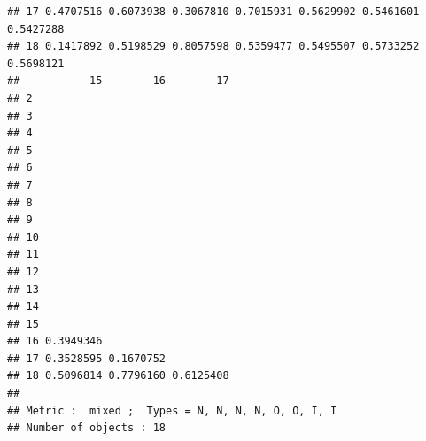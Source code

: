 \documentclass[
]{article}
\begin{document}
\begin{verbatim}
## 17 0.4707516 0.6073938 0.3067810 0.7015931 0.5629902 0.5461601 0.5427288
## 18 0.1417892 0.5198529 0.8057598 0.5359477 0.5495507 0.5733252 0.5698121
##           15        16        17
## 2                               
## 3                               
## 4                               
## 5                               
## 6                               
## 7                               
## 8                               
## 9                               
## 10                              
## 11                              
## 12                              
## 13                              
## 14                              
## 15                              
## 16 0.3949346                    
## 17 0.3528595 0.1670752          
## 18 0.5096814 0.7796160 0.6125408
## 
## Metric :  mixed ;  Types = N, N, N, N, O, O, I, I 
## Number of objects : 18
\end{verbatim}
\end{document}
